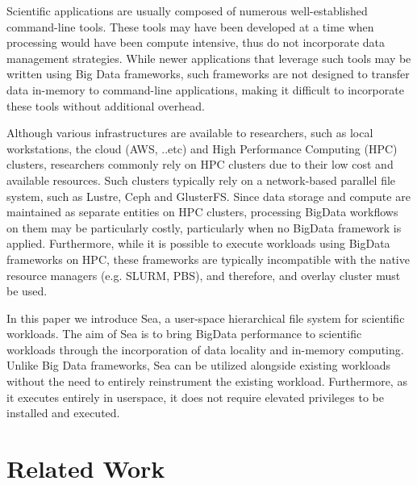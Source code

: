 Scientific applications are usually composed of numerous well-established command-line tools. These tools
may have been developed at a time when processing would have been compute intensive, thus do not incorporate
data management strategies. While newer applications
that leverage such tools may be written using Big Data frameworks, such frameworks are not designed to transfer
data in-memory to command-line applications, making it difficult to incorporate these tools without additional
overhead.

Although various infrastructures are available to researchers, such as local workstations, the cloud (AWS, ..etc) and 
High Performance Computing (HPC) clusters, researchers commonly rely on HPC clusters due to their low cost and available
resources. Such clusters typically rely on a network-based parallel file system, such as Lustre, Ceph and GlusterFS.
Since data storage and compute are maintained as separate entities on HPC clusters, processing BigData workflows on them
may be particularly costly, particularly when no BigData framework is applied. Furthermore, while it is possible to execute
workloads using BigData frameworks on HPC, these frameworks are typically incompatible with the native resource managers (e.g. SLURM, PBS),
and therefore, and overlay cluster must be used.

In this paper we introduce Sea, a user-space hierarchical file system for scientific workloads. The aim of Sea
is to bring BigData performance to scientific workloads through the incorporation of data locality and
in-memory computing. Unlike Big Data frameworks, Sea can be utilized alongside existing workloads without
the need to entirely reinstrument the existing workload. Furthermore, as it executes entirely in userspace,
it does not require elevated privileges to be installed and executed.







\section{Related Work}

